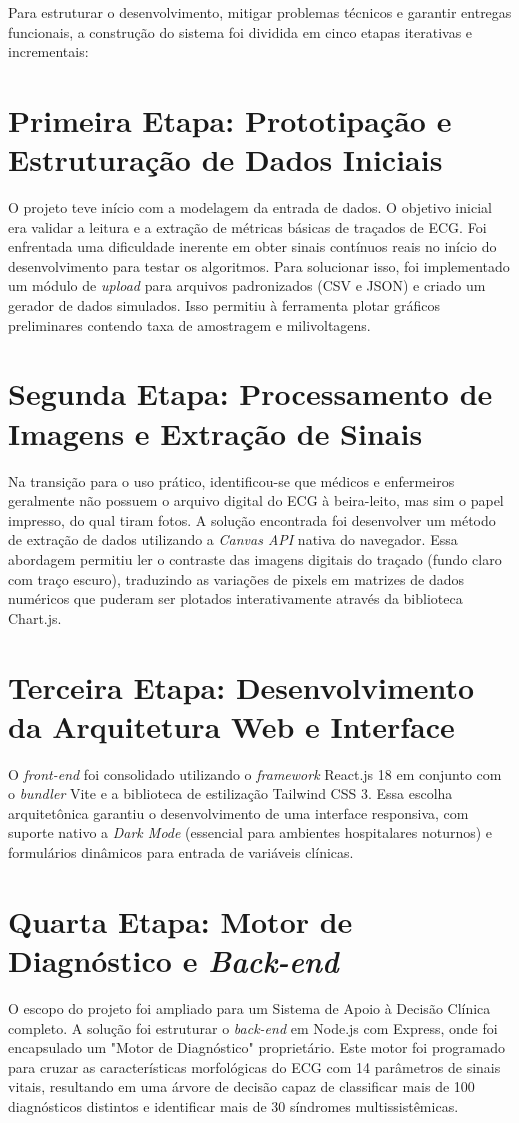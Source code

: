 \documentclass[portuguese,12pt,oneside,a4paper]{book}
\begin{document}
Para estruturar o desenvolvimento, mitigar problemas técnicos e garantir entregas funcionais, a construção do sistema foi dividida em cinco etapas iterativas e incrementais:

\section{Primeira Etapa: Prototipação e Estruturação de Dados Iniciais}
O projeto teve início com a modelagem da entrada de dados. O objetivo inicial era validar a leitura e a extração de métricas básicas de traçados de ECG. 
Foi enfrentada uma dificuldade inerente em obter sinais contínuos reais no início do desenvolvimento para testar os algoritmos. Para solucionar isso, foi implementado um módulo de \textit{upload} para arquivos padronizados (CSV e JSON) e criado um gerador de dados simulados. Isso permitiu à ferramenta plotar gráficos preliminares contendo taxa de amostragem e milivoltagens.

\section{Segunda Etapa: Processamento de Imagens e Extração de Sinais}
Na transição para o uso prático, identificou-se que médicos e enfermeiros geralmente não possuem o arquivo digital do ECG à beira-leito, mas sim o papel impresso, do qual tiram fotos.
A solução encontrada foi desenvolver um método de extração de dados utilizando a \textit{Canvas API} nativa do navegador. Essa abordagem permitiu ler o contraste das imagens digitais do traçado (fundo claro com traço escuro), traduzindo as variações de pixels em matrizes de dados numéricos que puderam ser plotados interativamente através da biblioteca Chart.js.

\section{Terceira Etapa: Desenvolvimento da Arquitetura Web e Interface}
O \textit{front-end} foi consolidado utilizando o \textit{framework} React.js 18 em conjunto com o \textit{bundler} Vite e a biblioteca de estilização Tailwind CSS 3. Essa escolha arquitetônica garantiu o desenvolvimento de uma interface responsiva, com suporte nativo a \textit{Dark Mode} (essencial para ambientes hospitalares noturnos) e formulários dinâmicos para entrada de variáveis clínicas.

\section{Quarta Etapa: Motor de Diagnóstico e \textit{Back-end}}
O escopo do projeto foi ampliado para um Sistema de Apoio à Decisão Clínica completo. A solução foi estruturar o \textit{back-end} em Node.js com Express, onde foi encapsulado um "Motor de Diagnóstico" proprietário. Este motor foi programado para cruzar as características morfológicas do ECG com 14 parâmetros de sinais vitais, resultando em uma árvore de decisão capaz de classificar mais de 100 diagnósticos distintos e identificar mais de 30 síndromes multissistêmicas.
\end{document}
